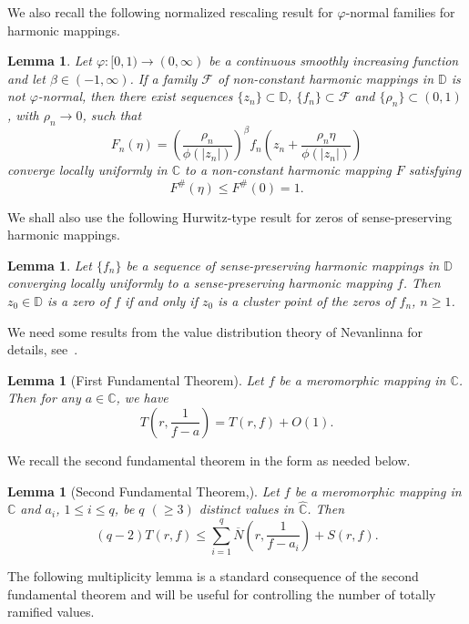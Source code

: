 \documentclass[10pt,a4paper]{amsart}
\numberwithin{equation}{section}
\newtheorem{lemma}[definition]{Lemma}
\begin{document}
  We also recall the following normalized rescaling result for 
  $\varphi$-normal families for harmonic mappings.
\begin{lemma}\label{zalcmann}\cite[Theorem 1.11]{charakbharti}
Let $\varphi:[0,1)\to(0,\infty)$ be a continuous smoothly increasing
function and let $\beta\in(-1,\infty)$. If a family
$\mathcal{F}$ of non-constant harmonic mappings in $\mathbb{D}$ is
not $\varphi$-normal, then there exist sequences
$\{z_n\}\subset\mathbb{D}$,
$\{f_n\}\subset\mathcal{F}$ and
$\{\rho_n\}\subset(0,1)$, with
$\rho_n\to0$, such that
\[
F_n(\eta)
=
\left(
\frac{\rho_n}{\phi(|z_n|)}
\right)^{\beta}
f_n\!\left(
z_n+
\frac{\rho_n\eta}{\phi(|z_n|)}
\right)
\]
converge locally uniformly in $\mathbb{C}$ to a non-constant harmonic
mapping $F$ satisfying
\[
F^{\#}(\eta)\leq F^{\#}(0)=1.
\]
\end{lemma}

We shall also use the following Hurwitz-type result for
zeros of sense-preserving harmonic mappings.

\begin{lemma}\label{hurwitz}\cite[Para.3, p. 10 ]{Duren}
Let $\{f_n\}$ be a sequence of sense-preserving harmonic mappings in
$\mathbb{D}$ converging locally uniformly to a sense-preserving harmonic
mapping $f$. Then $z_0\in\mathbb{D}$ is a zero of $f$ if and only if
$z_0$ is a cluster point of the zeros of $f_n$, $n\geq 1$.
\end{lemma}

We need some results from the value distribution theory of 
Nevanlinna for details, see~\cite{Lo2013}.
\begin{lemma}[First Fundamental Theorem]
Let $f$ be a meromorphic mapping in $\mathbb{C}$. Then for any
$a\in\mathbb{C}$, we have
\[
T\!\left(r,\frac{1}{f-a}\right)
=
T(r,f)+O(1).
\]
\end{lemma}

We recall the second fundamental theorem in the form as needed below.
\begin{lemma}[Second Fundamental Theorem,\label{SecFunThe}]
Let $f$ be a meromorphic mapping in $\mathbb{C}$ and
$a_i$, $1\leq i\leq q$, be $q$ $(\geq 3)$ distinct values in
$\mathbb{\hat C}$. Then
\[
(q-2)T(r,f)
\leq
\sum_{i=1}^{q}
\overline{N}\!\left(r,\frac{1}{f-a_i}\right)
+S(r,f).
\]
\end{lemma}

The following multiplicity lemma is a standard consequence of the
second fundamental theorem and will be useful for
controlling the number of totally ramified values. 
\end{document}
